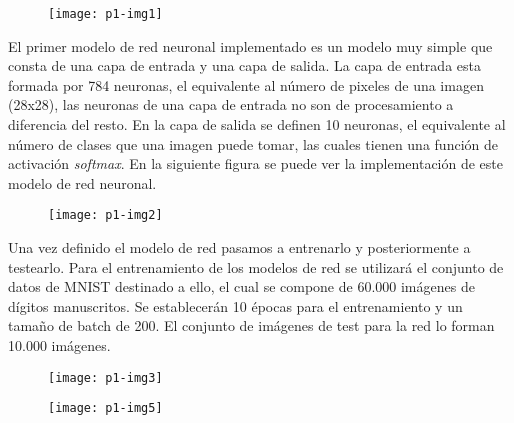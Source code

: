 \documentclass[10pt]{article}
\begin{document}
\begin{figure}[H]
	\begin{center}
 		\texttt{[image: p1-img1]}
	\end{center} 
\end{figure}

El primer modelo de red neuronal implementado es un modelo muy simple que consta de una capa de entrada y una capa de salida. La capa de entrada esta formada por 784 neuronas, el equivalente al número de pixeles de una imagen (28x28), las neuronas de una capa de entrada no son de procesamiento a diferencia del resto. En la capa de salida se definen 10 neuronas, el equivalente al número de clases que una imagen puede tomar, las cuales tienen una función de activación \textit{softmax}. En la siguiente figura se puede ver la implementación de este modelo de red neuronal. \\

\begin{figure}[H]
	\begin{center}
 		\texttt{[image: p1-img2]}
	\end{center} 
\end{figure}

Una vez definido el modelo de red pasamos a entrenarlo y posteriormente a testearlo. Para el entrenamiento de los modelos de red se utilizará el conjunto de datos de MNIST destinado a ello, el cual se compone de 60.000 imágenes de dígitos manuscritos. Se establecerán 10 épocas para el entrenamiento y un tamaño de batch de 200. El conjunto de imágenes de test para la red lo forman 10.000 imágenes. \\

\begin{figure}[H]
	\begin{center}
 		\texttt{[image: p1-img3]}
	\end{center} 
\end{figure}

\begin{figure}[H]
	\begin{center}
 		\texttt{[image: p1-img5]}
	\end{center} 
\end{figure}
\end{document}
